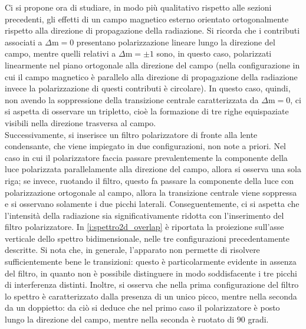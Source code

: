 \documentclass[twocolumn,10pt]{asme2ej}
\begin{document}
Ci si propone ora di studiare, in modo più qualitativo rispetto alle sezioni precedenti, gli effetti di un campo
magnetico esterno orientato ortogonalmente rispetto alla direzione di propagazione della radiazione. Si  ricorda che i
contributi associati a $\Delta \text{m} = 0$ presentano polarizzazione lineare lungo la direzione del campo, mentre
quelli relativi a $\Delta \text{m} = \pm 1$ sono, in questo caso, polarizzati linearmente nel piano ortogonale alla
direzione del campo (nella configurazione in cui il campo magnetico è parallelo alla direzione di propagazione della
radiazione invece la polarizzazione di questi contributi è circolare). In questo caso, quindi, non avendo la
soppressione della transizione centrale caratterizzata da $\Delta \text{m} = 0$, ci si aspetta di osservare un
tripletto, cioè la formazione di tre righe equispaziate visibili nella direzione trasversa al campo. \\
Successivamente, si inserisce un filtro polarizzatore di fronte alla lente condensante, che viene impiegato in due
configurazioni, non note a priori. Nel caso in cui il polarizzatore faccia passare prevalentemente la componente della
luce polarizzata parallelamente alla direzione del campo, allora si osserva una sola riga; se invece, ruotando il
filtro, questo fa passare la componente della luce con polarizzazione ortogonale al campo, allora la transizione
centrale viene soppressa e si osservano solamente i due picchi laterali. Conseguentemente, ci si aspetta che l'intensità
della radiazione sia significativamente ridotta con l'inserimento del filtro polarizzatore.  
In \autoref{i:spettro2d_overlap} è riportata la proiezione sull'asse verticale dello spettro bidimensionale, nelle tre
configurazioni precedentamente descritte. Si nota che, in generale, l'apparato non permette di risolvere
sufficientemente bene le transizioni: questo è particolarmente evidente in assenza del filtro, in quanto non è possibile
distinguere in modo soddisfacente i tre picchi di interferenza distinti. Inoltre, si osserva che nella prima
configurazione del filtro lo spettro è caratterizzato dalla presenza di un unico picco, mentre nella seconda da un
doppietto: da ciò si deduce che nel primo caso il polarizzatore è posto lungo la direzione del campo, mentre nella
seconda è ruotato di 90 gradi. 
\end{document}
